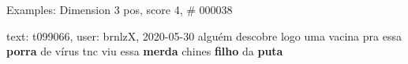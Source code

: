 \begin{frame}{Examples: Dimension 3 pos, score 4, \# 000038}
\footnotesize
\begin{exampleblock}{text: t099066, user: brnlzX, 2020-05-30}
alguém descobre logo uma vacina pra essa \textbf{porra} de vírus tnc viu essa 
\textbf{merda} chines \textbf{filho} da \textbf{puta} 
\end{exampleblock}
\end{frame}
